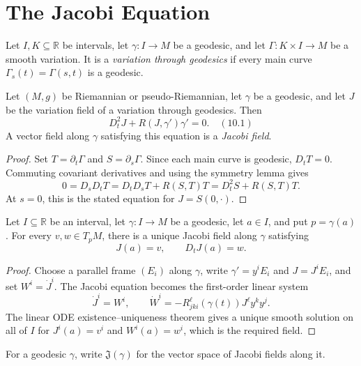 \section{The Jacobi Equation}

Let $I,K\subseteq\mathbb R$ be intervals, let $\gamma:I\to M$ be a geodesic,
and let $\Gamma:K\times I\to M$ be a smooth variation.  It is a
\emph{variation through geodesics} if every main curve
$\Gamma_s(t)=\Gamma(s,t)$ is a geodesic.

\begin{theorem}
\label{thm:jacobi-equation}
Let $(M,g)$ be Riemannian or pseudo-Riemannian, let $\gamma$ be a geodesic,
and let $J$ be the variation field of a variation through geodesics.  Then
\[
D_t^2J+R(J,\gamma')\gamma'=0. \quad (10.1)
\]
A vector field along $\gamma$ satisfying this equation is a \emph{Jacobi
field}.
\end{theorem}

\begin{proof}
\sketch
Set $T=\partial_t\Gamma$ and $S=\partial_s\Gamma$.  Since each main curve is
geodesic, $D_tT=0$.  Commuting covariant derivatives and using the symmetry
lemma gives
\[
0=D_sD_tT=D_tD_sT+R(S,T)T=D_t^2S+R(S,T)T.
\]
At $s=0$, this is the stated equation for $J=S(0,\mathord\cdot)$.
\end{proof}

\begin{proposition}
\label{prop:existence-uniqueness-jacobi-fields}
Let $I\subseteq\mathbb R$ be an interval, let $\gamma:I\to M$ be a geodesic,
let $a\in I$, and put $p=\gamma(a)$.  For every $v,w\in T_pM$, there is a
unique Jacobi field along $\gamma$ satisfying
\[
J(a)=v,\qquad D_tJ(a)=w.
\]
\end{proposition}

\begin{proof}
\sketch
Choose a parallel frame $(E_i)$ along $\gamma$, write
$\gamma'=y^iE_i$ and $J=J^iE_i$, and set $W^i=\dot J^i$.  The Jacobi equation
becomes the first-order linear system
\[
\dot J^i=W^i,
\qquad
\dot W^i=-R_{jki}^{\ell}(\gamma(t))J^\ell y^ky^j.
\]
The linear ODE existence--uniqueness theorem gives a unique smooth solution on
all of $I$ for $J^i(a)=v^i$ and $W^i(a)=w^i$, which is the required field.
\end{proof}

For a geodesic $\gamma$, write $\mathfrak J(\gamma)$ for the vector space of
Jacobi fields along it.

